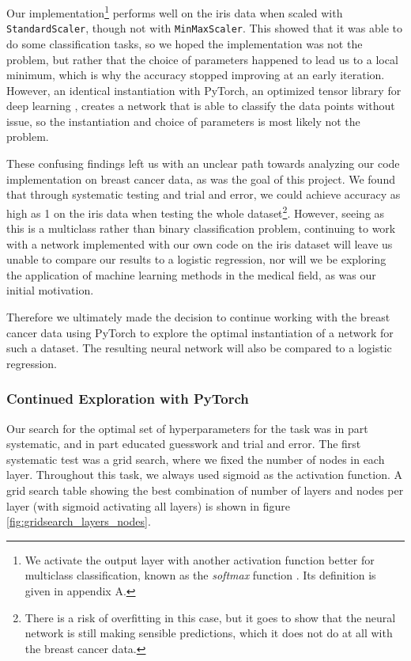 Our implementation\footnote{We activate the output layer with another activation function better for multiclass classification, known as the \emph{softmax} function \cite{softmax}. Its definition is given in appendix A.} performs well on the iris data when scaled with \texttt{StandardScaler}, though not with \texttt{MinMaxScaler}. This showed that it was able to do some classification tasks, so we hoped the implementation was not the problem, but rather that the choice of parameters happened to lead us to a local minimum, which is why the accuracy stopped improving at an early iteration. However, an identical instantiation with PyTorch, an optimized tensor library for deep learning \cite{pytorch}, creates a network that is able to classify the data points without issue, so the instantiation and choice of parameters is most likely not the problem.

These confusing findings left us with an unclear path towards analyzing our code implementation on breast cancer data, as was the goal of this project. We found that through systematic testing and trial and error, we could achieve accuracy as high as 1 on the iris data when testing the whole dataset\footnote{There is a risk of overfitting in this case, but it goes to show that the neural network is still making sensible predictions, which it does not do at all with the breast cancer data.}. However, seeing as this is a multiclass rather than binary classification problem, continuing to work with a network implemented with our own code on the iris dataset will leave us unable to compare our results to a logistic regression, nor will we be exploring the application of machine learning methods in the medical field, as was our initial motivation.

Therefore we ultimately made the decision to continue working with the breast cancer data using PyTorch to explore the optimal instantiation of a network for such a dataset. The resulting neural network will also be compared to a logistic regression. 

\subsubsection{Continued Exploration with PyTorch}
Our search for the optimal set of hyperparameters for the task was in part systematic, and in part educated guesswork and trial and error. The first systematic test was a grid search, where we fixed the number of nodes in each layer. Throughout this task, we always used sigmoid as the activation function. A grid search table showing the best combination of number of layers and nodes per layer (with sigmoid activating all layers) is shown in figure \ref{fig:gridsearch_layers_nodes}. 

